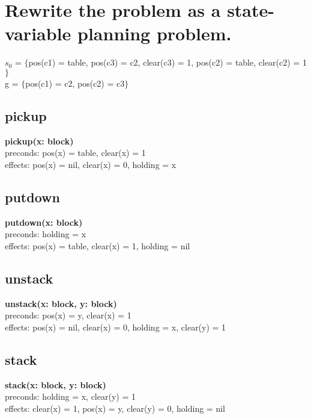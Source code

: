 \documentclass[paper=a4, fontsize=11pt]{scrartcl} %
\numberwithin{equation}{section} %
\numberwithin{figure}{section} %
\numberwithin{table}{section} %
\begin{document}
\section{Rewrite the problem as a state-variable planning problem.}
$s_0$ = $\{$pos(c1) = table, pos(c3) = c2, clear(c3) = 1, pos(c2) = table, clear(c2) = 1 $\}$\\
g = $\{$pos(c1) = c2, pos(c2) = c3$\}$

\subsection{pickup}
\textbf{pickup(x: block)}\\
preconds: pos(x) = table, clear(x) = 1\\
effects: pos(x) = nil, clear(x) = 0, holding = x\\

\subsection{putdown}

\textbf{putdown(x: block)}\\
preconds: holding = x\\
effects: pos(x) = table, clear(x) = 1, holding = nil\\

\subsection{unstack}

\textbf{unstack(x: block, y: block)}\\
preconds: pos(x) = y, clear(x) = 1\\
effects: pos(x) = nil, clear(x) = 0, holding = x, clear(y) = 1\\

\subsection{stack}

\textbf{stack(x: block, y: block)}\\
preconds: holding = x, clear(y) = 1\\
effects: clear(x) = 1, pos(x) = y, clear(y) = 0, holding = nil\\
\end{document}
